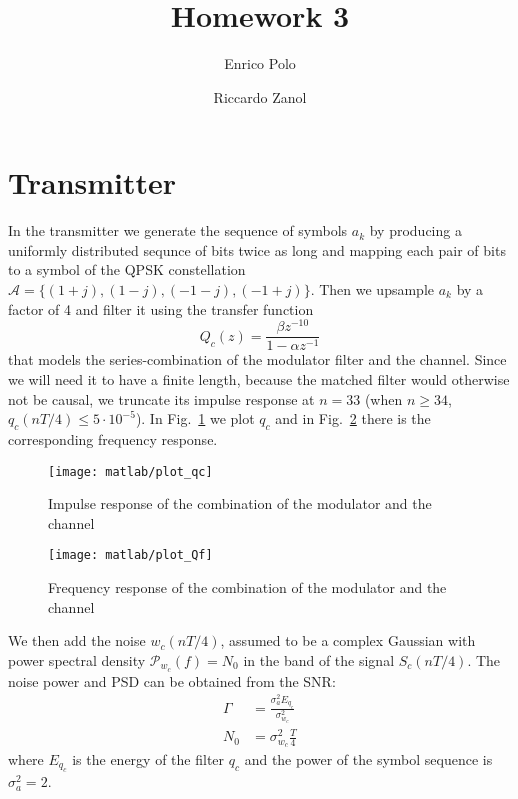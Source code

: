 \documentclass[a4paper,oneside]{article}
\author{Enrico Polo \and Riccardo Zanol}
\title{Homework 3}
\begin{document}
\maketitle
\section{Transmitter}
In the transmitter we generate the sequence of symbols $a_k$ by
producing a uniformly distributed sequnce of bits twice as long and
mapping each pair of bits to a symbol of the QPSK constellation $
\mathcal{A} = \{(1+j),(1-j),(-1-j),(-1+j)\}$. Then we upsample $a_k$
by a factor of 4 and filter it using the transfer function
\begin{equation}
  Q_c(z) = \frac{\beta z^{-10}}{1 - \alpha z^{-1}}
\end{equation}
that models the series-combination of the modulator filter and
  the channel.  Since we will need it to have a finite length,
because the matched filter would otherwise not be causal, we truncate
its impulse response at $n=33$ (when $n \geq 34$, $q_c(nT/4) \leq
5\cdot10^{-5}$). In Fig.~\ref{plot:qc} we plot $q_c$ and in
Fig.~\ref{plot:Qf} there is the corresponding frequency response.
\begin{figure}[htbp]
  \centering
  \texttt{[image: matlab/plot\_qc]}
  \caption{Impulse response of the combination of the modulator and
    the channel}
  \label{plot:qc}
\end{figure}
\begin{figure}[htbp]
  \centering
  \texttt{[image: matlab/plot\_Qf]}
  \caption{Frequency response of the combination of the modulator and
    the channel}
  \label{plot:Qf}
\end{figure}

We then add the noise $w_c(nT/4)$, assumed to be
a complex Gaussian with power spectral density $\mathcal{P}_{w_c}(f) =
N_0$ in the band of the signal $S_c(nT/4)$. The noise power and PSD
can be obtained from the SNR:
\begin{align}
  \Gamma &= \frac{\sigma^2_a E_{q_c}}{\sigma^2_{w_c}} \\
  N_0 &= \sigma^2_{w_c}\frac{T}{4}
\end{align}
where $E_{q_c}$ is the energy of the filter $q_c$ and the power of the
symbol sequence is $\sigma^2_a = 2$.
\end{document}
